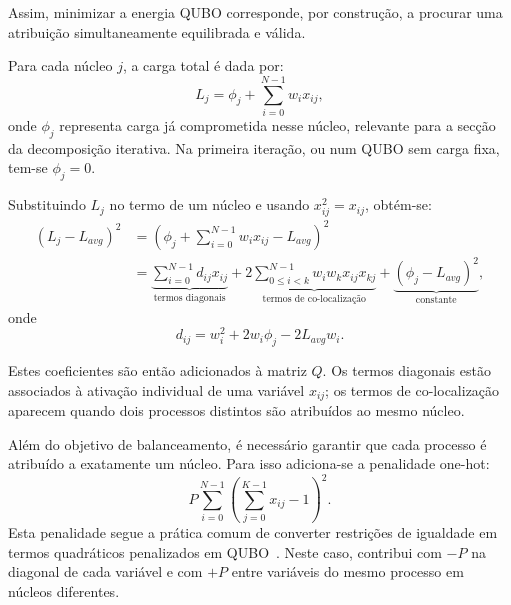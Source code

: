 Assim, minimizar a energia \acs{QUBO} corresponde, por construção, a procurar uma atribuição
simultaneamente equilibrada e válida.

Para cada núcleo $j$, a carga total é dada por:
\begin{equation}
    L_j = \phi_j + \sum_{i=0}^{N-1} w_i x_{ij},
\end{equation}
onde $\phi_j$ representa carga já comprometida nesse núcleo, relevante para a secção da
decomposição iterativa. Na primeira iteração, ou num \acs{QUBO} sem carga fixa, tem-se
$\phi_j = 0$.

Substituindo $L_j$ no termo de um núcleo e usando $x_{ij}^2=x_{ij}$, obtém-se:
\begin{equation}
\begin{aligned}
(L_j - L_{avg})^2
&= \left(\phi_j + \sum_{i=0}^{N-1}w_ix_{ij} - L_{avg}\right)^2 \\
&= \underbrace{\sum_{i=0}^{N-1} d_{ij}x_{ij}}_{\text{termos diagonais}}
 + 2\underbrace{\sum_{0 \leq i < k}^{N-1} w_iw_kx_{ij}x_{kj}}_{\text{termos de co-localização}}
 + \underbrace{(\phi_j - L_{avg})^2}_{\text{constante}},
\end{aligned}
\end{equation}
onde
\begin{equation}
    d_{ij}=w_i^2 + 2w_i\phi_j - 2L_{avg}w_i.
\end{equation}

Estes coeficientes são então
adicionados à matriz $Q$. Os termos diagonais estão associados
à ativação individual de uma variável $x_{ij}$; os termos de co-localização aparecem
quando dois processos distintos são atribuídos ao mesmo núcleo.

Além do objetivo de balanceamento, é necessário garantir que cada processo é atribuído a
exatamente um núcleo. Para isso adiciona-se a penalidade one-hot:
\begin{equation}
    P \sum_{i=0}^{N-1}\left(\sum_{j=0}^{K-1}x_{ij} - 1\right)^2.
\end{equation}
Esta penalidade segue a prática comum de converter restrições de igualdade em termos
quadráticos penalizados em \acs{QUBO}~\cite{Glover2019QUBO}. Neste caso, contribui com $-P$
na diagonal de cada variável e com $+P$ entre variáveis do mesmo processo em núcleos diferentes.

